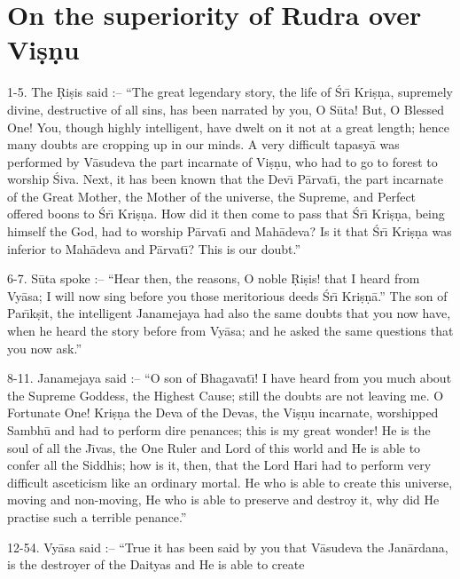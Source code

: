 \chapter{On the superiority of Rudra over Vi\d{s}\d{n}u}

1-5. The \d{R}i\d{s}is said :-- ``The great legendary story, the life of \'Sr\={\i} Kri\d{s}\d{n}a, supremely divine, destructive of all sins, has been narrated by you, O S\=uta! But, O Blessed One! You, though highly intelligent, have dwelt on it not at a great length; hence many doubts are cropping up in our minds. A very difficult tapasy\=a was performed by V\=asudeva the part incarnate of Vi\d{s}\d{n}u, who had to go to forest to worship \'Siva. Next, it has been known that the Dev\={\i} P\=arvat\={\i}, the part incarnate of the Great Mother, the Mother of the universe, the Supreme, and Perfect offered boons to \'Sr\={\i} Kri\d{s}\d{n}a. How did it then come to pass that \'Sr\={\i} Kri\d{s}\d{n}a, being himself the God, had to worship P\=arvat\={\i} and Mah\=adeva? Is it that \'Sr\={\i} Kri\d{s}\d{n}a was inferior to Mah\=adeva and P\=arvat\={\i}? This is our doubt.''

6-7. S\=uta spoke :-- ``Hear then, the reasons, O noble \d{R}i\d{s}is! that I heard from Vy\=asa; I will now sing before you those meritorious deeds \'Sr\={\i} Kri\d{s}\d{n}\=a.'' The son of Par\={\i}k\d{s}it, the intelligent Janamejaya had also the same doubts that you now have, when he heard the story before from Vy\=asa; and he asked the same questions that you now ask.''

8-11. Janamejaya said :-- ``O son of Bhagavat\={\i}! I have heard from you much about the Supreme Goddess, the Highest Cause; still the doubts are not leaving me. O Fortunate One! Kri\d{s}\d{n}a the Deva of the Devas, the Vi\d{s}\d{n}u incarnate, worshipped Sambh\=u and had to perform dire penances; this is my great wonder! He is the soul of all the J\={\i}vas, the One Ruler and Lord of this world and He is able to confer all the Siddhis; how is it, then, that the Lord Hari had to perform very difficult asceticism like an ordinary mortal. He who is able to create this universe, moving and non-moving, He who is able to preserve and destroy it, why did He practise such a terrible penance.''

12-54. Vy\=asa said :-- ``True it has been said by you that V\=asudeva the Jan\=ardana, is the destroyer of the Daityas and He is able to create

